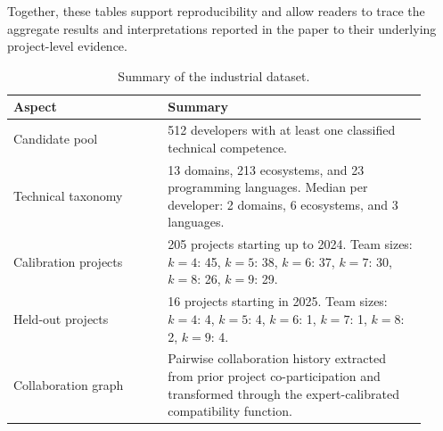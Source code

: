 \documentclass[conference]{IEEEtran}
\begin{document}
Together, these tables support reproducibility and allow readers to trace the aggregate results and interpretations reported in the paper to their underlying project-level evidence.



\begin{table}[H]
\centering
\footnotesize
\setlength{\tabcolsep}{3pt}
\caption{Summary of the industrial dataset.}
\label{tab:data-summary}
\begin{tabular}{p{0.34\linewidth}p{0.58\linewidth}}
\hline
Aspect & Summary \\
\hline
Candidate pool & 512 developers with at least one classified technical competence. \\
Technical taxonomy & 13 domains, 213 ecosystems, and 23 programming languages.
Median per developer: 2 domains, 6 ecosystems, and 3 languages. \\
Calibration projects & 205 projects starting up to 2024. Team sizes:
$k{=}4$: 45, $k{=}5$: 38, $k{=}6$: 37, $k{=}7$: 30, $k{=}8$: 26, $k{=}9$: 29. \\
Held-out projects & 16 projects starting in 2025. Team sizes:
$k{=}4$: 4, $k{=}5$: 4, $k{=}6$: 1, $k{=}7$: 1, $k{=}8$: 2, $k{=}9$: 4. \\
Collaboration graph & Pairwise collaboration history extracted from prior project co-participation and transformed through the expert-calibrated compatibility function. \\
\hline
\end{tabular}
\end{table}


\begin{table}[H]
\caption{Retained practitioner-validation design.}
\label{tab:rq5-design}
\centering
\small
{}
\end{table}
\end{document}
